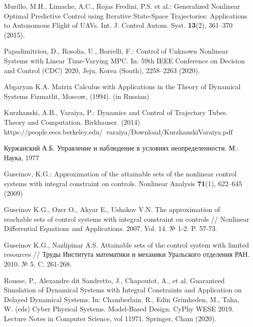 \documentclass[../main.tex]{subfiles}
\begin{document}
\begin{thebibliography}{99}
Murillo, M.H., Limache, A.C., Rojas Fredini, P.S. et al.: Generalized Nonlinear Optimal Predictive Control using Iterative State-Space
Trajectories: Applications to Autonomous Flight of UAVs. Int. J. Control Autom. Syst. \textbf{13}(2), 361--370 (2015).

Papadimitriou, D., Rosolia, U., Borrelli, F.: Control of Unknown Nonlinear Systems with Linear Time-Varying MPC. In: 59th IEEE Conference on Decision and Control (CDC) 2020, Jeju, Korea (South), 2258--2263 (2020). 


Abgaryan K.A. Matrix Calculus with Applications in the Theory of Dynamical Systems Fizmatlit, Moscow, (1994). (in Russian)

Kurzhanski, A.B., Varaiya, P.: Dynamics and Control of Trajectory Tubes. Theory and Computation. Birkhauser. (2014)\\ https://people.eecs.berkeley.edu/~varaiya/Download/KurzhanskiVaraiya.pdf

Куржанский А.Б. Управление и наблюдение в условиях неопределенности. М.: Наука, 1977

Guseinov, K.G.: Approximation of the attainable sets of the nonlinear control systems with integral constraint on controls. Nonlinear Analysis \textbf{71}(1), 622--645 (2009) 

Guseinov K.G., Ozer O., Akyar E., Ushakov V.N. The approximation of reachable sets of control systems with integral constraint on controls // Nonlinear Differential Equations and Applications. 2007. Vol. 14. № 1-2. P. 57-73.

Guseinov K.G., Nazlipinar A.S. Attainable sets of the control system with limited resources // Труды Института математики и механики Уральского отделения РАН. 2010. № 5. C. 261-268.

Rousse, P., Alexandre dit Sandretto, J., Chapoutot, A., et al. Guaranteed Simulation of Dynamical Systems with Integral Constraints and Application on Delayed Dynamical Systems. In: Chamberlain, R., Edin Grimheden, M., Taha, W. (eds) Cyber Physical Systems. Model-Based Design. CyPhy WESE 2019. Lecture Notes in Computer Science, vol 11971. Springer, Cham (2020). 


\end{thebibliography}
\end{document}
